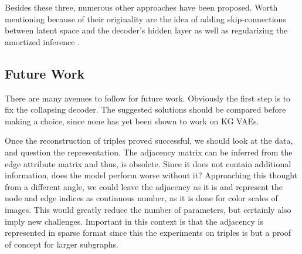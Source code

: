 





Besides these three, numerous other approaches have been proposed. Worth mentioning because of their originality are the idea of adding skip-connections between latent space and the decoder's hidden layer \cite{dieng_avoiding_2019} as well as regularizing the amortized inference \cite{shu_amortized_2019}.  







\subsection{Future Work}

There are many avenues to follow for future work. Obviously the first step is to fix the collapsing decoder. The suggested solutions should be compared before making a choice, since none has yet been shown to work on KG VAEs.

Once the reconstruction of triples proved successful, we should look at the data, and question the representation. The adjacency matrix can be inferred from the edge attribute matrix and thus, is obsolete. Since it does not contain additional information, does the model perform worse without it? Approaching this thought from a different angle, we could leave the adjacency as it is and represent the node and edge indices as continuous number, as it is done for color scales of images. This would greatly reduce the number of parameters, but certainly also imply new challenges. Important in this context is that the adjacency is represented in sparse format since this the experiments on triples is but a proof of concept for larger subgraphs. 

